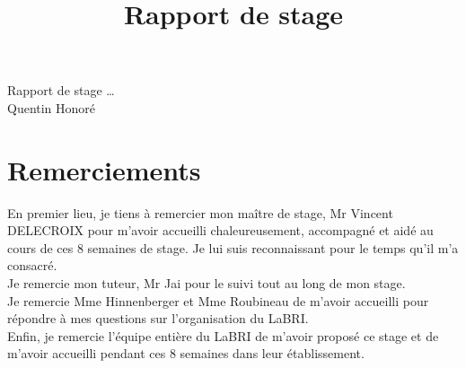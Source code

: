 \documentclass[a4paper]{article}
\title{Rapport de stage}
\begin{document}
\thispagestyle{empty}
\begin{center}

\centering

\vspace{3cm}

{\Huge Rapport de stage \ldots} \\ \vspace{0.3cm}
{\large Quentin Honoré}

\vspace{2cm}

\end{center}
\newpage
\tableofcontents
\newpage
\section*{Remerciements}
En premier lieu, je tiens à remercier mon maître de stage, Mr Vincent DELECROIX pour m'avoir accueilli chaleureusement, accompagné et aidé au cours de ces 8 semaines de stage. Je lui suis reconnaissant pour le temps qu'il m'a consacré.\\
Je remercie mon tuteur, Mr Jai pour le suivi tout au long de mon stage.\\
Je remercie Mme Hinnenberger et Mme Roubineau de m'avoir accueilli pour répondre à mes questions sur l'organisation du LaBRI.\\
Enfin, je remercie l'équipe entière du LaBRI de m'avoir proposé ce stage et de m'avoir accueilli pendant ces 8 semaines dans leur établissement.
\newpage
\end{document}

